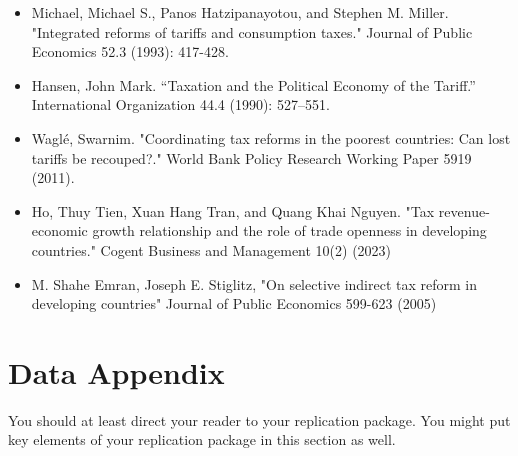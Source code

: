 \documentclass[12pt]{article}
\begin{document}
\begin{itemize}
\item Michael, Michael S., Panos Hatzipanayotou, and Stephen M. Miller. "Integrated reforms of tariffs and consumption taxes." Journal of Public Economics 52.3 (1993): 417-428.
\item Hansen, John Mark. “Taxation and the Political Economy of the Tariff.” International Organization 44.4 (1990): 527–551.
\item Waglé, Swarnim. "Coordinating tax reforms in the poorest countries: Can lost tariffs be recouped?." World Bank Policy Research Working Paper 5919 (2011).
\item Ho, Thuy Tien, Xuan Hang Tran, and Quang Khai Nguyen. "Tax revenue-economic growth relationship and the role of trade openness in developing countries." Cogent Business and Management 10(2) (2023)
\item M. Shahe Emran, Joseph E. Stiglitz, "On selective indirect tax reform in developing countries" Journal of Public Economics 599-623 (2005)
\end{itemize}










\newpage
\section*{Data Appendix} \label{sec:appendixa}

You should at least direct your reader to your replication package. You might put key elements of your replication package in this section as well.
\end{document}
